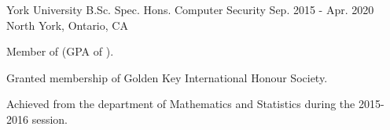 

\begin{cventries}

  \cventry
    {York University} %
    {B.Sc. Spec. Hons. Computer Security} %
    {Sep. 2015 - Apr. 2020} %
    {North York, Ontario, CA} %
    {
      \begin{cvitems} %
        \item {Member of  (GPA of ).}
        \item {Granted membership of Golden Key International Honour Society.}
        \item {Achieved  from the department of Mathematics and Statistics during the 2015-2016 session.}
      \end{cvitems} 
    }

\end{cventries}
